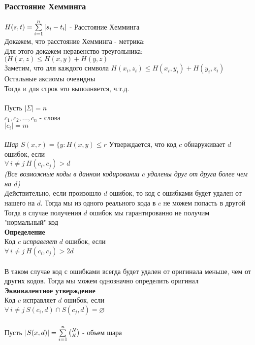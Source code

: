 \documentclass[12pt]{article}
\begin{document}
\subsubsection{Расстояние Хемминга}
$H(s,t) = \sum\limits_{i=1}^n |s_i - t_i|$ - Расстояние Хемминга\\
Докажем, что расстояние Хемминга - метрика:\\
Для этого докажем неравенство треугольника:\\
$(H(x,z) \leq H(x,y) + H(y,z)$\\
Заметим, что для каждого символа
$H(x_i, z_i) \leq H(x_i, y_i) + H(y_i, z_i)$\\
Остальные аксиомы очевидны\\
Тогда и для строк это выполняется, ч.т.д.\\\\
Пусть $|\Sigma| = n$\\
$c_1,c_2,\ldots,c_n$ - слова\\
$|c_i| = m$\\\\
\textit{Шар} $S(x,r) = \{ y: H(x,y) \leq r$
Утверждается, что код $c$ обнаруживает $d$ ошибок, если\\
$\forall\,i\neq j\ H(c_i, c_j) > d$\\
\textit{(Все возможные коды в данном кодировании $c$ удалены друг от друга более чем на $d$)}\\
Действительно, если произошло $d$ ошибок, то код с ошибками будет удален от нашего на $d$. Тогда мы из одного реального кода в $c$ не можем попасть в другой\\
Тогда в случае получения $d$ ошибок мы гарантированно не получим "нормальный" код\\
\textbf{Определение}\\
Код $c$ \textit{исправляет} $d$ ошибок, если\\
$\forall\,i\neq j\ H(c_i, c_j) > 2d$\\\\
В таком случае код с ошибками всегда будет удален от оригинала меньше, чем от других кодов. Тогда мы можем однозначно определить оригинал\\
\textbf{Эквивалентное утверждение}\\
Код $c$ исправляет $d$ ошибок, если\\
$\forall\,i\neq j\ S(c_i,d) \cap S(c_j, d) = \varnothing$\\\\
Пусть $|S(x,d)| = \sum\limits_{i=1}^n \binom{N}{K}$ - объем шара\\
\end{document}
